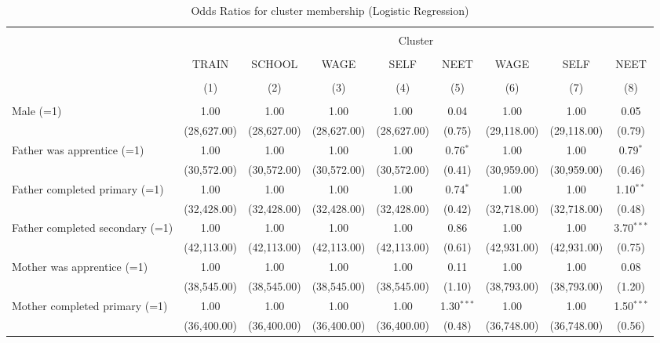 \documentclass[
  a4paper, twoside, 12pt]{book}
\begin{document}
\begin{singlespacing}
\begin{table}[H] \centering 
  \caption{Odds Ratios for cluster membership (Logistic Regression)} 
  \label{tab:tbl-clusterreg} 
\scriptsize 
\begin{tabular}{@{\extracolsep{-6pt}}lcccccccc} 
\\[-1.8ex]\hline 
\hline \\[-1.8ex] 
 & \multicolumn{8}{c}{Cluster} \\ 
\cline{2-9} 
\\[-1.8ex] & TRAIN & SCHOOL & WAGE & SELF & NEET & WAGE & SELF & NEET \\ 
\\[-1.8ex] & (1) & (2) & (3) & (4) & (5) & (6) & (7) & (8)\\ 
\hline \\[-1.8ex] 
 Male (=1) & 1.00 & 1.00 & 1.00 & 1.00 & 0.04 & 1.00 & 1.00 & 0.05 \\ 
  & (28,627.00) & (28,627.00) & (28,627.00) & (28,627.00) & (0.75) & (29,118.00) & (29,118.00) & (0.79) \\ 
  Father was apprentice (=1) & 1.00 & 1.00 & 1.00 & 1.00 & 0.76$^{*}$ & 1.00 & 1.00 & 0.79$^{*}$ \\ 
  & (30,572.00) & (30,572.00) & (30,572.00) & (30,572.00) & (0.41) & (30,959.00) & (30,959.00) & (0.46) \\ 
  Father completed primary (=1) & 1.00 & 1.00 & 1.00 & 1.00 & 0.74$^{*}$ & 1.00 & 1.00 & 1.10$^{**}$ \\ 
  & (32,428.00) & (32,428.00) & (32,428.00) & (32,428.00) & (0.42) & (32,718.00) & (32,718.00) & (0.48) \\ 
  Father completed secondary (=1) & 1.00 & 1.00 & 1.00 & 1.00 & 0.86 & 1.00 & 1.00 & 3.70$^{***}$ \\ 
  & (42,113.00) & (42,113.00) & (42,113.00) & (42,113.00) & (0.61) & (42,931.00) & (42,931.00) & (0.75) \\ 
  Mother was apprentice (=1) & 1.00 & 1.00 & 1.00 & 1.00 & 0.11 & 1.00 & 1.00 & 0.08 \\ 
  & (38,545.00) & (38,545.00) & (38,545.00) & (38,545.00) & (1.10) & (38,793.00) & (38,793.00) & (1.20) \\ 
  Mother completed primary (=1) & 1.00 & 1.00 & 1.00 & 1.00 & 1.30$^{***}$ & 1.00 & 1.00 & 1.50$^{***}$ \\ 
  & (36,400.00) & (36,400.00) & (36,400.00) & (36,400.00) & (0.48) & (36,748.00) & (36,748.00) & (0.56) \\ 

\end{tabular}
\end{table}
\end{singlespacing}
\end{document}
